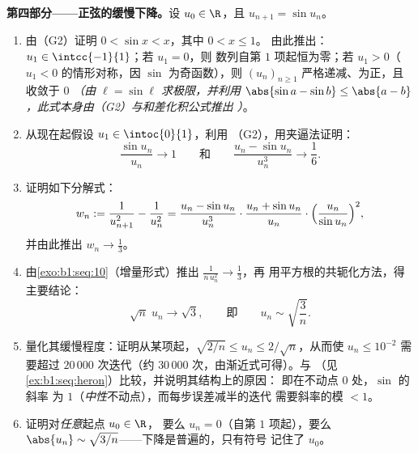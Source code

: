 \begin{problem}[{周末问题——切萨罗--施托尔茨定理，
以及 $u_n \sim \sqrt{3/n}$ 的渐近性，对于 $u_{n+1} = \sin
u_n$}]
\medskip
\noindent\textbf{第四部分——正弦的缓慢下降。}设
        $u_0 \in \R$，且 $u_{n+1} = \sin u_n$。
\begin{enumerate}[resume]
  \item 由（G2）证明 $0 < \sin x < x$，其中 $0 < x \leq 1$。
        由此推出：$u_1 \in \intcc{-1}{1}$；若 $u_1 = 0$，则
        数列自第 $1$ 项起恒为零；若 $u_1 > 0$（
        $u_1 < 0$ 的情形对称，因 $\sin$ 为奇函数），则
        $(u_n)_{n \geq 1}$ 严格递减、为正，且
        收敛于 $0$ \emph{（由 $\ell =
        \sin \ell$ 求极限，并利用 $\abs{\sin a - \sin b} \leq \abs{a -
        b}$，此式本身由（G2）与和差化积公式推出
        ）}。
  \item 从现在起假设 $u_1 \in \intoc{0}{1}$，利用
        （G2），用夹逼法证明：
        \[
        \frac{\sin u_n}{u_n} \to 1
        \qquad\text{和}\qquad
        \frac{u_n - \sin u_n}{u_n^{3}} \to \frac16 .
        \]
  \item 证明如下分解式：
        \[
        w_n := \frac{1}{u_{n+1}^{2}} - \frac{1}{u_n^{2}}
        = \frac{u_n - \sin u_n}{u_n^{3}} \cdot
        \frac{u_n + \sin u_n}{u_n} \cdot
        \Bigl(\frac{u_n}{\sin u_n}\Bigr)^{2},
        \]
        并由此推出 $w_n \to \frac13$。
  \item 由\cref{exo:b1:seq:10}（增量形式）推出
        $\frac{1}{n\,u_n^{2}} \to \frac13$，再
        用平方根的共轭化方法，得主要结论：
        \[
        \sqrt n\;u_n \longrightarrow \sqrt 3 ,
        \qquad\text{即}\qquad
        u_n \sim \sqrt{\frac 3n} .
        \]
  \item 量化其缓慢程度：证明从某项起，$\sqrt{2/n}
        \leq u_n \leq 2/\sqrt n$，从而使 $u_n \leq
        10^{-2}$ 需要超过 $20\,000$ 次迭代（约
        $30\,000$ 次，由渐近式可得）。与
        （见\cref{ex:b1:seq:heron}）比较，并说明其结构上的原因：
        即在不动点 $0$ 处，$\sin$ 的斜率
        为 $1$（\emph{中性}不动点），而每步误差减半的迭代
        需要斜率的模 $< 1$。
  \item 证明对\emph{任意}起点 $u_0 \in \R$，
        要么 $u_n = 0$（自第 $1$ 项起），要么 $\abs{u_n} \sim
        \sqrt{3/n}$——下降是普遍的，只有符号
        记住了 $u_0$。
\end{enumerate}


\end{problem}
